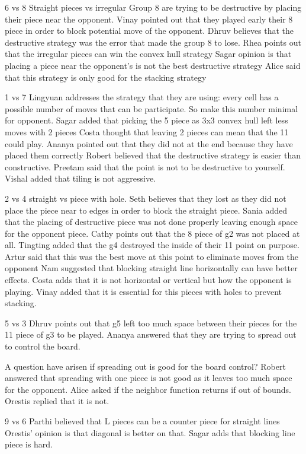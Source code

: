 6 vs 8
Straight pieces vs irregular
Group 8 are trying to be destructive by placing their piece near the opponent.
Vinay pointed out that they played early their 8 piece in order to block potential
move of the opponent.
Dhruv believes that the destructive strategy was the error that made the group 8 to lose.
Rhea points out that the irregular pieces can win the convex hull strategy
Sagar opinion is that placing a piece near the opponent’s is not the best destructive strategy
Alice said that this strategy is only good for the stacking strategy


1 vs 7
Lingyuan addresses the strategy that they are using: every cell has a possible number of moves that can be participate. So make this number minimal for opponent.
Sagar added that picking the 5 piece as 3x3 convex hull left less moves with 2 pieces
Costa thought that leaving 2 pieces can mean that the 11 could play.
Ananya pointed out that they did not at the end because they have placed them correctly
Robert believed that the destructive strategy is easier than constructive.
Preetam said that the point is not to be destructive to yourself.
Vishal added that tiling is not aggressive.


2 vs 4
straight vs piece with hole.
Seth believes that they lost as they did not place the piece near to edges in order to block the straight piece.
Sania added that the placing of destructive piece was not done properly leaving enough space for the opponent piece.
Cathy points out that the 8 piece of g2 was not placed at all.
Tingting added that the g4 destroyed the inside of their 11 point on purpose.
Artur said that this was the best move at this point to eliminate moves from the opponent
Nam suggested that blocking straight line horizontally can have better effects.
Costa adds that it is not horizontal or vertical but how the opponent is playing.
Vinay added that it is essential for this pieces with holes to prevent stacking.


5 vs 3
Dhruv points out that g5 left too much space between their pieces for the 11 piece of g3 to be played.
Ananya answered that they are trying to spread out to control the board.

A question have arisen if spreading out is good for the board control?
Robert answered that spreading with one piece is not good as it leaves too much space for the opponent.
Alice asked if the neighbor function returns if out of bounds. Orestis replied that it is not.

9 vs 6 
Parthi believed that L pieces can be a counter piece for straight lines
Orestis’ opinion is that diagonal is better on that.
Sagar adds that blocking line piece is hard.

